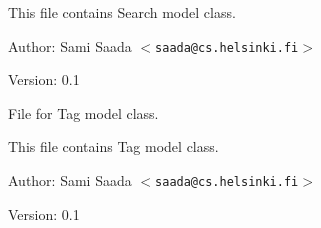 This file contains Search model class. \begin{Desc}
\item[Author:]Sami Saada $<${\tt saada@cs.helsinki.fi}$>$ \end{Desc}
\begin{Desc}
\item[Version:]0.1\end{Desc}
File for Tag model class.

This file contains Tag model class. \begin{Desc}
\item[Author:]Sami Saada $<${\tt saada@cs.helsinki.fi}$>$ \end{Desc}
\begin{Desc}
\item[Version:]0.1 \end{Desc}

